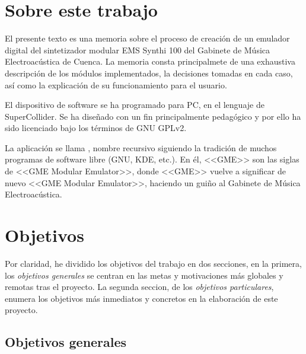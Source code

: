 \section{Sobre este trabajo}

El presente texto es una memoria sobre el proceso de creación de un emulador digital del sintetizador modular EMS Synthi 100 del Gabinete de Música Electroacústica de Cuenca. La memoria consta principalmete de una exhaustiva descripción de los módulos implementados, la decisiones tomadas en cada caso, así como la explicación de su funcionamiento para el usuario.

El dispositivo de software se ha programado para PC, en el lenguaje de SuperCollider. Se ha diseñado con un fin principalmente pedagógico y por ello ha sido licenciado bajo los términos de GNU GPLv2. 

La aplicación se llama \appName, nombre recursivo siguiendo la tradición de muchos programas de software libre (GNU, KDE, etc.). En él, <<GME>> son las siglas de <<GME Modular Emulator>>, donde <<GME>> vuelve a significar de nuevo <<GME Modular Emulator>>, haciendo un guiño al Gabinete de Música Electroacústica.


\section{Objetivos}

Por claridad, he dividido los objetivos del trabajo en dos secciones, en la primera, los \textit{objetivos generales} se centran en las metas y motivaciones más globales y remotas tras el proyecto. La segunda seccion, de los \textit{objetivos particulares}, enumera los objetivos más inmediatos y concretos en la elaboración de este proyecto.


\subsection{Objetivos generales}


